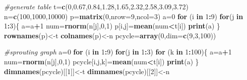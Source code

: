 \documentclass[
]{article}
\newenvironment{Shaded}{\begin{snugshade}}{\end{snugshade}}
\newcommand{\CommentTok}[1]{\textcolor[rgb]{0.56,0.35,0.01}{\textit{#1}}}
\newcommand{\ControlFlowTok}[1]{\textcolor[rgb]{0.13,0.29,0.53}{\textbf{#1}}}
\newcommand{\DataTypeTok}[1]{\textcolor[rgb]{0.13,0.29,0.53}{#1}}
\newcommand{\DecValTok}[1]{\textcolor[rgb]{0.00,0.00,0.81}{#1}}
\newcommand{\FloatTok}[1]{\textcolor[rgb]{0.00,0.00,0.81}{#1}}
\newcommand{\KeywordTok}[1]{\textcolor[rgb]{0.13,0.29,0.53}{\textbf{#1}}}
\newcommand{\NormalTok}[1]{#1}
\newcommand{\OperatorTok}[1]{\textcolor[rgb]{0.81,0.36,0.00}{\textbf{#1}}}
\begin{document}
\begin{Shaded}
\begin{Highlighting}[]
\CommentTok{#generate table}
\NormalTok{t=}\KeywordTok{c}\NormalTok{(}\DecValTok{0}\NormalTok{,}\FloatTok{0.67}\NormalTok{,}\FloatTok{0.84}\NormalTok{,}\FloatTok{1.28}\NormalTok{,}\FloatTok{1.65}\NormalTok{,}\FloatTok{2.32}\NormalTok{,}\FloatTok{2.58}\NormalTok{,}\FloatTok{3.09}\NormalTok{,}\FloatTok{3.72}\NormalTok{)}
\NormalTok{n=}\KeywordTok{c}\NormalTok{(}\DecValTok{100}\NormalTok{,}\DecValTok{1000}\NormalTok{,}\DecValTok{10000}\NormalTok{)}
\NormalTok{p=}\KeywordTok{matrix}\NormalTok{(}\DecValTok{0}\NormalTok{,}\DataTypeTok{nrow=}\DecValTok{9}\NormalTok{,}\DataTypeTok{ncol=}\DecValTok{3}\NormalTok{)}
\NormalTok{a=}\DecValTok{0}
\ControlFlowTok{for}\NormalTok{ (i }\ControlFlowTok{in} \DecValTok{1}\OperatorTok{:}\DecValTok{9}\NormalTok{)}
  \ControlFlowTok{for}\NormalTok{(j }\ControlFlowTok{in} \DecValTok{1}\OperatorTok{:}\DecValTok{3}\NormalTok{)\{}
\NormalTok{    a=a}\OperatorTok{+}\DecValTok{1}
\NormalTok{    num=}\KeywordTok{rnorm}\NormalTok{(n[j],}\DecValTok{0}\NormalTok{,}\DecValTok{1}\NormalTok{)}
\NormalTok{    p[i,j]=}\KeywordTok{mean}\NormalTok{(num}\OperatorTok{<}\NormalTok{t[i])}
    \KeywordTok{print}\NormalTok{(a)}
\NormalTok{  \}}
\KeywordTok{rownames}\NormalTok{(p)<-t}
\KeywordTok{colnames}\NormalTok{(p)<-n}
\NormalTok{pcycle=}\KeywordTok{array}\NormalTok{(}\DecValTok{0}\NormalTok{,}\DataTypeTok{dim=}\KeywordTok{c}\NormalTok{(}\DecValTok{9}\NormalTok{,}\DecValTok{3}\NormalTok{,}\DecValTok{100}\NormalTok{))}

\CommentTok{#sprouting graph}
\NormalTok{a=}\DecValTok{0}
\ControlFlowTok{for}\NormalTok{ (i }\ControlFlowTok{in} \DecValTok{1}\OperatorTok{:}\DecValTok{9}\NormalTok{)}
  \ControlFlowTok{for}\NormalTok{(j }\ControlFlowTok{in} \DecValTok{1}\OperatorTok{:}\DecValTok{3}\NormalTok{)}
    \ControlFlowTok{for}\NormalTok{ (k }\ControlFlowTok{in} \DecValTok{1}\OperatorTok{:}\DecValTok{100}\NormalTok{)\{}
\NormalTok{      a=a}\OperatorTok{+}\DecValTok{1}
\NormalTok{      num=}\KeywordTok{rnorm}\NormalTok{(n[j],}\DecValTok{0}\NormalTok{,}\DecValTok{1}\NormalTok{)}
\NormalTok{      pcycle[i,j,k]=}\KeywordTok{mean}\NormalTok{(num}\OperatorTok{<}\NormalTok{t[i])}
      \KeywordTok{print}\NormalTok{(a)}
\NormalTok{    \}}
\KeywordTok{dimnames}\NormalTok{(pcycle)[[}\DecValTok{1}\NormalTok{]]<-t}
\KeywordTok{dimnames}\NormalTok{(pcycle)[[}\DecValTok{2}\NormalTok{]]<-n}


\end{Highlighting}
\end{Shaded}
\end{document}
